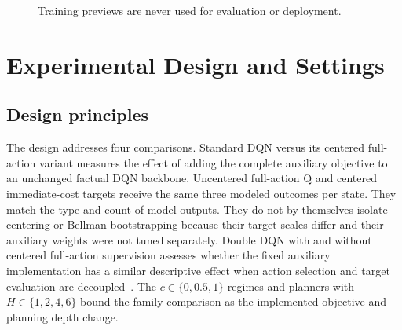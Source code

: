 \documentclass[11pt]{article}
\begin{document}
\begin{figure}[H]
\centering
{}
\par\smallskip
\caption*{Training previews are never used for evaluation or deployment.}
\label{alg:cbad}
\end{figure}

\section{Experimental Design and Settings}
\label{sec:experiments}

\subsection{Design principles}

\color{red}%
The design addresses four comparisons. Standard DQN versus its centered full-action variant measures the effect of adding the complete auxiliary objective to an unchanged factual DQN backbone. Uncentered full-action Q and centered immediate-cost targets receive the same three modeled outcomes per state. They match the type and count of model outputs. They do not by themselves isolate centering or Bellman bootstrapping because their target scales differ and their auxiliary weights were not tuned separately. Double DQN with and without centered full-action supervision assesses whether the fixed auxiliary implementation has a similar descriptive effect when action selection and target evaluation are decoupled~\cite{vanhasselt2016double}. The $c\in\{0,0.5,1\}$ regimes and planners with $H\in\{1,2,4,6\}$ bound the family comparison as the implemented objective and planning depth change.
\color{black}%
\end{document}
